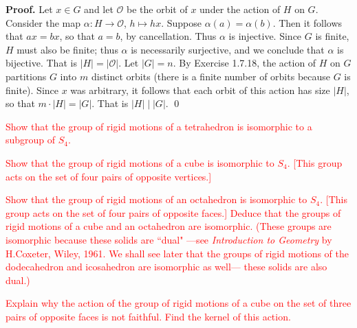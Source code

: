 \begin{enumerate}
      \textbf{Proof.} Let $x \in G$ and let $\mathcal{O}$ be the orbit of $x$
      under the action of $H$ on $G$. Consider the map
      $\alpha : H \rightarrow \mathcal{O}$, $h \mapsto hx$. Suppose
      $\alpha(a) = \alpha(b)$. Then it follows that $ax = bx$, so that $a = b$,
      by cancellation. Thus $\alpha$ is injective. Since $G$ is finite, $H$
      must also be finite; thus $\alpha$ is necessarily surjective, and we 
      conclude that $\alpha$ is bijective. That is $|H| = |\mathcal{O}|$. Let
      $|G| = n$. By Exercise 1.7.18, the action of $H$ on $G$ partitions $G$
      into $m$ distinct orbits (there is a finite number of orbits because $G$
      is finite). Since $x$ was arbitrary, it follows that each orbit of this
      action has size $|H|$, so that $m\cdot|H| = |G|$. That is $|H| \mid |G|$.
      \qed
   \textcolor{red}{\item[1.7.20]  Show that the group of rigid motions of a tetrahedron is
                  isomorphic to a subgroup of $S_4$.
   \item[1.7.21]  Show that the group of rigid motions of a cube is isomorphic
                  to $S_4$. [This group acts on the set of four pairs of
                  opposite vertices.]
   \item[1.7.22]  Show that the group of rigid motions of an octahedron is
                  isomorphic to $S_4$. [This group acts on the set
                  of four pairs of opposite faces.] Deduce that the groups of
                  rigid motions of a cube and an octahedron are isomorphic.
                  (These groups are isomorphic because these solids are ``dual"
                  ---see \textit{Introduction to Geometry} by H.Coxeter, Wiley,
                  1961. We shall see later that the groups of rigid motions of
                  the dodecahedron and icosahedron are isomorphic as well---
                  these solids are also dual.)
   \item[1.7.23]  Explain why the action of the group of rigid motions of a cube
                  on the set of three pairs of opposite faces is not faithful.
                  Find the kernel of this action.}
\end{enumerate}
